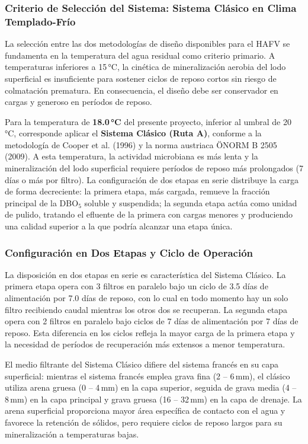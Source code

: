 \documentclass[12pt,a4paper]{article}
\begin{document}
\subsubsection*{Criterio de Selección del Sistema: Sistema Clásico en Clima Templado-Frío}

La selección entre las dos metodologías de diseño disponibles para el HAFV se fundamenta en la temperatura del agua residual como criterio primario. A temperaturas inferiores a 15\,°C, la cinética de mineralización aerobia del lodo superficial es insuficiente para sostener ciclos de reposo cortos sin riesgo de colmatación prematura. En consecuencia, el diseño debe ser conservador en cargas y generoso en períodos de reposo.

Para la temperatura de \textbf{18.0\,°C} del presente proyecto, inferior al umbral de 20\,°C, corresponde aplicar el \textbf{Sistema Clásico (Ruta A)}, conforme a la metodología de Cooper et al. (1996) y la norma austriaca ÖNORM B 2505 (2009). A esta temperatura, la actividad microbiana es más lenta y la mineralización del lodo superficial requiere períodos de reposo más prolongados (7 días o más por filtro). La configuración de dos etapas en serie distribuye la carga de forma decreciente: la primera etapa, más cargada, remueve la fracción principal de la DBO$_5$ soluble y suspendida; la segunda etapa actúa como unidad de pulido, tratando el efluente de la primera con cargas menores y produciendo una calidad superior a la que podría alcanzar una etapa única.

\subsubsection*{Configuración en Dos Etapas y Ciclo de Operación}

La disposición en dos etapas en serie es característica del Sistema Clásico. La primera etapa opera con 3 filtros en paralelo bajo un ciclo de 3.5 días de alimentación por 7.0 días de reposo, con lo cual en todo momento hay un solo filtro recibiendo caudal mientras los otros dos se recuperan. La segunda etapa opera con 2 filtros en paralelo bajo ciclos de 7 días de alimentación por 7 días de reposo. Esta diferencia en los ciclos refleja la mayor carga de la primera etapa y la necesidad de períodos de recuperación más extensos a menor temperatura.

El medio filtrante del Sistema Clásico difiere del sistema francés en su capa superficial: mientras el sistema francés emplea grava fina (2 -- 6\,mm), el clásico utiliza arena gruesa (0 -- 4\,mm) en la capa superior, seguida de grava media (4 -- 8\,mm) en la capa principal y grava gruesa (16 -- 32\,mm) en la capa de drenaje. La arena superficial proporciona mayor área específica de contacto con el agua y favorece la retención de sólidos, pero requiere ciclos de reposo largos para su mineralización a temperaturas bajas.
\end{document}
